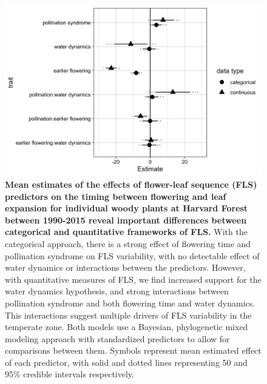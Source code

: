 \documentclass[12pt]{article}
\begin{document}
 \begin{figure}[h!]
        \centering
          \includegraphics[width=\textwidth]{..//HF.jpeg}
          \caption{\textbf{Mean estimates of the effects of flower-leaf sequence (FLS) predictors on the timing between flowering and leaf expansion for individual woody plants at Harvard Forest between 1990-2015 reveal important differences between categorical and quantitative frameworks of FLS.}  With the categorical approach, there is a strong effect of flowering time and pollination syndrome on FLS variability, with no detectable effect of water dynamics or interactions between the predictors. However, with quantitative measures of FLS, we find increased support for the water dynamics hypothesis, and strong interactions between pollination syndrome and both flowering time and water dynamics. This interactions suggest multiple drivers of FLS variability in the temperate zone.  Both models use a Bayesian, phylogenetic mixed modeling approach with standardized predictors to allow for comparisons between them. Symbols represent mean estimated effect of each predictor, with solid and dotted lines representing 50 and 95\% credible intervals respectively.}  
        \label{fig:muplots.HF}
    \end{figure}    

    
\end{document}
